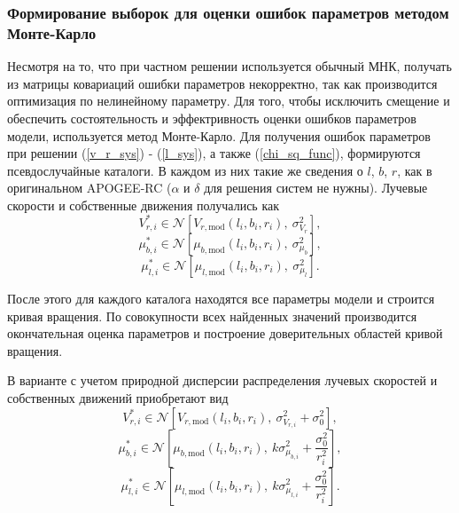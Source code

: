 \documentclass{matmex-diploma-custom}
\begin{document}
\subsubsection{Формирование выборок для оценки ошибок параметров методом \\ Монте-Карло} \label{mk}
Несмотря на то, что при частном решении используется обычный МНК, получать из матрицы ковариаций ошибки параметров некорректно, так как производится оптимизация по нелинейному параметру. Для того, чтобы исключить смещение и обеспечить состоятельность и эффектривность оценки ошибков параметров модели, используется метод Монте-Карло. Для получения ошибок параметров при решении (\ref{v_r_sys}) - (\ref{l_sys}), а также (\ref{chi_sq_func}), формируются псевдослучайные каталоги. В каждом из них такие же сведения о $l$, $b$, $r$, как в оригинальном APOGEE-RC ($\alpha$ и $\delta$ для решения систем не нужны). Лучевые скорости и собственные движения получались как
\begin{equation}
        V_{r, i}^{*} \in \mathcal{N} \left[ V_{r, \mathrm{mod}}(l_i, b_i, r_i), ~\sigma^2_{V_r} \right],
\end{equation}
\begin{equation}
        \mu_{b, i}^{*} \in \mathcal{N} \left[ \mu_{b, \mathrm{mod}}(l_i, b_i, r_i), ~\sigma^2_{\mu_b} \right],
\end{equation}
\begin{equation}
        \mu_{l, i}^{*} \in \mathcal{N} \left[ \mu_{l, \mathrm{mod}}(l_i, b_i, r_i), ~\sigma^2_{\mu_l} \right].
\end{equation}
\par После этого для каждого каталога находятся все параметры модели и строится кривая вращения. По совокупности всех найденных значений производится окончательная оценка параметров и построение доверительных областей кривой вращения.

\par В варианте с учетом природной дисперсии распределения лучевых скоростей и собственных движений приобретают вид
\begin{equation}
        V_{r, i}^{*} \in \mathcal{N} \left[ V_{r, \mathrm{mod}}(l_i, b_i, r_i),  ~\sigma^2_{V_{r, i}} + \sigma^2_0\right],
\end{equation}
\begin{equation}
        \mu_{b, i}^{*} \in \mathcal{N} \left[ \mu_{b, \mathrm{mod}}(l_i, b_i, r_i),  ~k \sigma^2_{\mu_{b, i}} + \frac{\sigma_0^2}{r^2_i} \right],
\end{equation}
\begin{equation}
        \mu_{l, i}^{*} \in \mathcal{N} \left[ \mu_{l, \mathrm{mod}}(l_i, b_i, r_i), ~k \sigma^2_{\mu_{l, i}} + \frac{\sigma_0^2}{r^2_i} \right].
\end{equation}
\end{document}
